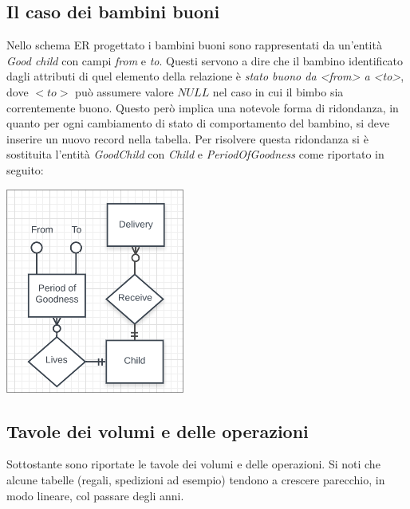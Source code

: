 \documentclass[12pt]{report}
\begin{document}
\subsection{Il caso dei bambini buoni}
Nello schema ER progettato i bambini buoni sono rappresentati da un'entità \textit{Good 
child} con campi \textit{from} e \textit{to}. Questi servono a dire che il bambino identificato dagli
attributi di quel elemento della relazione è \textit{stato buono da <from> a <to>}, dove $<to>$ può
assumere valore $NULL$ nel caso in cui il bimbo sia correntemente buono. Questo però implica una notevole
forma di ridondanza, in quanto per ogni cambiamento di stato di comportamento del bambino, si deve 
inserire un nuovo record nella tabella. Per risolvere questa ridondanza si è sostituita l'entità
\textit{GoodChild} con \textit{Child} e \textit{PeriodOfGoodness} come riportato in seguito:
\begin{center}
\includegraphics[scale=0.7]{goodChild.png}
\end{center}

\subsection{Tavole dei volumi e delle operazioni}
Sottostante sono riportate le tavole dei volumi e delle operazioni. Si noti che alcune tabelle (regali,
spedizioni ad esempio) tendono a crescere parecchio, in modo lineare, col passare degli anni.
\end{document}
